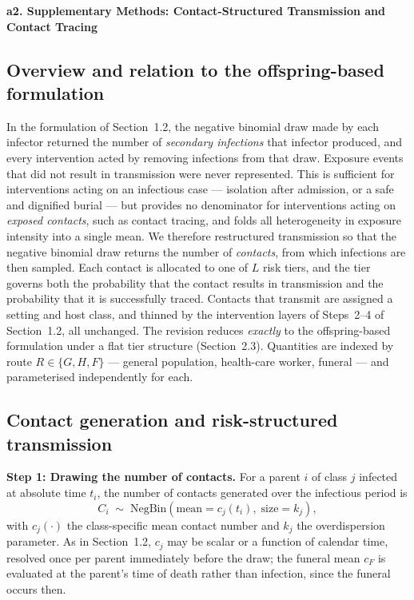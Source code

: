 \documentclass[9pt,letterpaper]{extarticle}
\newcommand{\NB}{\mathrm{NegBin}}
\begin{document}
{\bfseries\large a2. Supplementary Methods: Contact-Structured Transmission and Contact Tracing}

\setcounter{section}{2}
\setcounter{subsection}{0}

\subsection{Overview and relation to the offspring-based formulation}

In the formulation of Section~1.2, the negative binomial draw made by each infector returned the number of \emph{secondary infections} that infector produced, and every intervention acted by removing infections from that draw. Exposure events that did not result in transmission were never represented. This is sufficient for interventions acting on an infectious case --- isolation after admission, or a safe and dignified burial --- but provides no denominator for interventions acting on \emph{exposed contacts}, such as contact tracing, and folds all heterogeneity in exposure intensity into a single mean. We therefore restructured transmission so that the negative binomial draw returns the number of \emph{contacts}, from which infections are then sampled. Each contact is allocated to one of $L$ risk tiers, and the tier governs both the probability that the contact results in transmission and the probability that it is successfully traced. Contacts that transmit are assigned a setting and host class, and thinned by the intervention layers of Steps~2--4 of Section~1.2, all unchanged. The revision reduces \emph{exactly} to the offspring-based formulation under a flat tier structure (Section~2.3). Quantities are indexed by route $R \in \{G, H, F\}$ --- general population, health-care worker, funeral --- and parameterised independently for each.

\subsection{Contact generation and risk-structured transmission}

\textbf{Step 1: Drawing the number of contacts.} For a parent $i$ of class $j$ infected at absolute time $t_i$, the number of contacts generated over the infectious period is
\begin{equation}
C_i \;\sim\; \NB\!\left(\text{mean} = c_j(t_i),\; \text{size} = k_j\right),
\end{equation}
with $c_j(\cdot)$ the class-specific mean contact number and $k_j$ the overdispersion parameter. As in Section~1.2, $c_j$ may be scalar or a function of calendar time, resolved once per parent immediately before the draw; the funeral mean $c_F$ is evaluated at the parent's time of death rather than infection, since the funeral occurs then.
\end{document}
